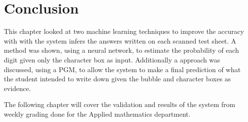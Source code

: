 \section{Conclusion}

This chapter looked at two machine learning techniques to improve the accuracy with with the system infers the answers written on each scanned test sheet. A method was shown, using a neural network, to estimate the probability of each digit given only the character box as input. Additionally a approach was discussed, using a PGM, to allow the system to make a final prediction of what the student intended to write down given the bubble and character boxes as evidence.

The following chapter will cover the validation and results of the system from weekly grading done for the Applied mathematics department.